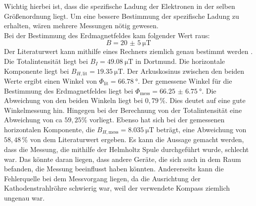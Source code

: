 Wichtig hierbei ist, dass die spezifische Ladung der Elektronen in der selben Größenordnung liegt. Um eine bessere
Bestimmung der spezifische Ladung zu erhalten, wären mehrere Messungen nötig gewesen.\\
Bei der Bestimmung des Erdmagnetfeldes kam folgender Wert raus:
\begin{equation*}
  B= \SI{20(5)}{\micro\tesla}
\end{equation*}
Der Literaturwert kann mithilfe eines Rechners ziemlich genau bestimmt werden \cite{3}.
Die Totalintensität liegt bei $B_I =\SI{49,08}{\micro\tesla}$ in Dortmund.
Die horizontale Komponente liegt bei $B_{H, \text{lit}} = \SI{19.35}{\micro\tesla}$.
Der Arkuskosinus zwischen den beiden Werte ergibt einen Winkel von $\Phi_{\text{lit}} = \SI{66.78}{\degree}$.
Der gemessene Winkel für die Bestimmung des Erdmagnetfeldes liegt bei $\Phi_{\text{mess}} = \SI{66.25(675)}{\degree}$.
Die Abweichung von den beiden Winkeln liegt bei $0,79 \, \%$. Dies deutet auf eine gute Winkelmessung hin.
Hingegen bei der Berechnung von der Totalintensität eine Abweichung von ca $59,25 \%$ vorliegt.
Ebenso hat sich bei der gemessenen horizontalen Komponente, die $B_{H, \text{mess}} =\SI{8.035}{\micro\tesla}$ beträgt,
eine Abweichung von $58,48 \,\%$ von dem Literaturwert ergeben.
Es kann die Aussage gemacht werden, dass die Messung, die mithilfe der Helmholtz Spule
durchgeführt wurde, schlecht war. Das könnte daran liegen, dass andere Geräte,
die sich auch in dem Raum befanden, die Messung beeinflusst haben könnten. Andererseits
kann die Fehlerquelle bei dem Messvorgang liegen, da die Ausrichtung der Kathodenstrahlröhre
schwierig war, weil der verwendete Kompass ziemlich ungenau war.
